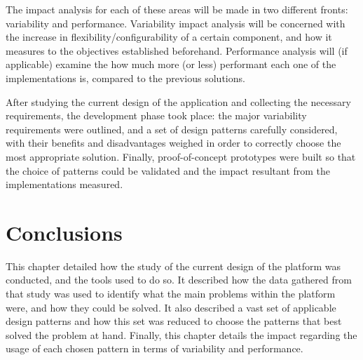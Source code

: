 The impact analysis for each of these areas will be made in two different fronts: variability and performance. Variability impact analysis will be concerned with the increase in flexibility/configurability of a certain component, and how it measures to the objectives established beforehand. Performance analysis will (if applicable) examine the how much more (or less) performant each one of the implementations is, compared to the previous solutions.

After studying the current design of the application and collecting the necessary requirements, the development phase took place: the major variability requirements were outlined, and a set of design patterns carefully considered, with their benefits and disadvantages weighed in order to correctly choose the most appropriate solution. Finally, proof-of-concept prototypes were built so that the choice of patterns could be validated and the impact resultant from the implementations measured.





\section{Conclusions}\label{sec:approach_results_conclusions}

This chapter detailed how the study of the current design of the platform was conducted, and the tools used to do so. It described how the data gathered from that study was used to identify what the main problems within the platform were, and how they could be solved. It also described a vast set of applicable design patterns and how this set was reduced to choose the patterns that best solved the problem at hand. Finally, this chapter details the impact regarding the usage of each chosen pattern in terms of variability and performance.



